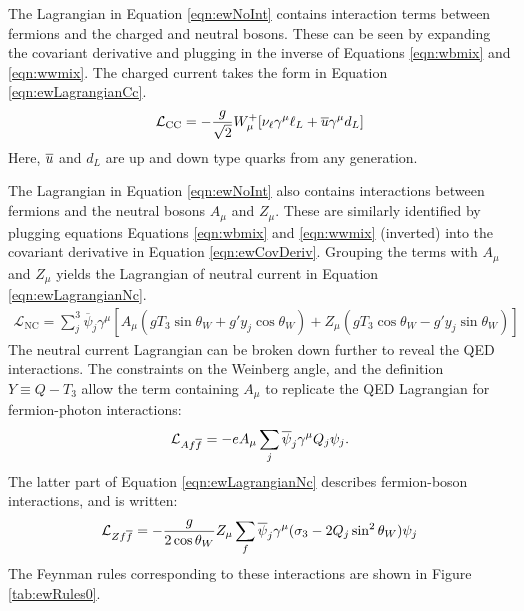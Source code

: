 The Lagrangian in Equation \ref{eqn:ewNoInt} contains interaction terms between fermions and the charged and neutral bosons.
These can be seen by expanding the covariant derivative and plugging in the inverse of Equations \ref{eqn:wbmix} and \ref{eqn:wwmix}.
The charged current takes the form in Equation \ref{eqn:ewLagrangianCc}.
\begin{equation}\begin{split}\label{eqn:ewLagrangianCc}
    \mathcal{L}_\text{CC} = -\frac{g}{\sqrt{2}}W_\mu^+[\nu_\ell\gamma^\mu \ell_L+\overline{u}\gamma^\mu d_L]
\end{split}\end{equation}
Here, $\overline{u}$ and $d_L$ are up and down type quarks from any generation.

The Lagrangian in Equation \ref{eqn:ewNoInt} also contains interactions between fermions and the neutral bosons $A_\mu$ and $Z_\mu$.
These are similarly identified by plugging equations Equations \ref{eqn:wbmix} and \ref{eqn:wwmix} (inverted) into the covariant derivative in Equation \ref{eqn:ewCovDeriv}.
Grouping the terms with $A_\mu$ and $Z_\mu$ yields the Lagrangian of neutral current in Equation \ref{eqn:ewLagrangianNc}.
\begin{equation}\begin{split}\label{eqn:ewLagrangianNc}
    \mathcal{L}_\text{NC} = \sum_j^3 \overline{\psi}_j\gamma^\mu\left[A_\mu(gT_3\sin\theta_W+g'y_j\cos\theta_W)+Z_\mu(gT_3\cos\theta_W-g'y_j\sin\theta_W)\right]
\end{split}\end{equation}
The neutral current Lagrangian can be broken down further to reveal the QED interactions.
The constraints on the Weinberg angle, and the definition $Y\equiv Q-T_3$ allow the term containing $A_\mu$ to replicate the QED Lagrangian for fermion-photon interactions:
\begin{equation}\begin{split}
    \mathcal{L}_{Af\overline{f}}=-eA_\mu\sum_j\overline{\psi}_j\gamma^\mu Q_j\psi_j.
\end{split}\end{equation}
The latter part of Equation \ref{eqn:ewLagrangianNc} describes fermion-\Z boson interactions, and is written:
\begin{equation}\begin{split}
    \mathcal{L}_{Zf\overline{f}} = -\frac{g}{2\cos\theta_W}Z_\mu\sum_f\overline{\psi}_j\gamma^\mu(\sigma_3-2Q_j\sin^2\theta_W)\psi_j
\end{split}\end{equation}
The Feynman rules corresponding to these interactions are shown in Figure \ref{tab:ewRules0}.


